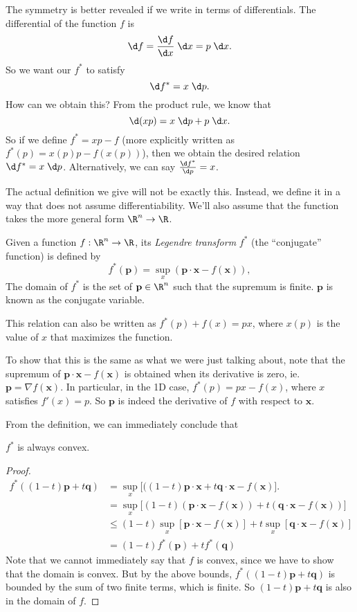 \documentclass[a4paper]{article}
\begin{document}
The symmetry is better revealed if we write in terms of differentials. The differential of the function $f$ is
\[
  \d f = \frac{\d f}{\d x}\;\d x = p\;\d x.
\]
So we want our $f^*$ to satisfy
\[
  \d f^* = x\;\d p.
\]
How can we obtain this? From the product rule, we know that
\[
  \d (xp) = x\;\d p + p\;\d x.
\]
So if we define $f^* = xp - f$ (more explicitly written as $f^*(p) = x(p)p - f(x(p))$), then we obtain the desired relation $\d f^* = x\;\d p$. Alternatively, we can say $\frac{\d f^*}{\d p} = x$.

The actual definition we give will not be exactly this. Instead, we define it in a way that does not assume differentiability. We'll also assume that the function takes the more general form $\R^n \to \R$.
\begin{defi}
  Given a function $f: \R^n \to \R$, its \emph{Legendre transform} $f^*$ (the ``conjugate'' function) is defined by
  \[
    f^*(\mathbf{p}) = \sup_{x}(\mathbf{p}\cdot \mathbf{x} - f(\mathbf{x})),
  \]
  The domain of $f^*$ is the set of $\mathbf{p}\in \R^n$ such that the supremum is finite. $\mathbf{p}$ is known as the conjugate variable.
\end{defi}
This relation can also be written as $f^*(p) + f(x) = px$, where $x(p)$ is the value of $x$ that maximizes the function.

To show that this is the same as what we were just talking about, note that the supremum of $\mathbf{p}\cdot \mathbf{x} - f(\mathbf{x})$ is obtained when its derivative is zero, ie. $\mathbf{p} = \nabla f(\mathbf{x})$. In particular, in the 1D case, $f^*(p) = px - f(x)$, where $x$ satisfies $f'(x) = p$. So $\mathbf{p}$ is indeed the derivative of $f$ with respect to $\mathbf{x}$.

From the definition, we can immediately conclude that
\begin{lemma}
  $f^*$ is always convex.
\end{lemma}

\begin{proof}
  \begin{align*}
    f^*((1 - t)\mathbf{p} + t\mathbf{q}) &= \sup_x \big[((1 - t)\mathbf{p}\cdot \mathbf{x} + t\mathbf{q}\cdot \mathbf{x} - f(\mathbf{x})\big].\\
    &= \sup_x \big[(1 - t)(\mathbf{p}\cdot \mathbf{x} - f(\mathbf{x})) + t(\mathbf{q}\cdot \mathbf{x} - f(\mathbf{x}))\big]\\
    &\leq (1 - t)\sup_x [\mathbf{p}\cdot \mathbf{x} - f(\mathbf{x})] + t\sup_x[\mathbf{q}\cdot \mathbf{x}  - f(\mathbf{x})]\\
    &= (1 - t)f^*(\mathbf{p}) + tf^*(\mathbf{q})
  \end{align*}
  Note that we cannot immediately say that $f$ is convex, since we have to show that the domain is convex. But by the above bounds, $f^*((1 - t)\mathbf{p} + t\mathbf{q})$  is bounded by the sum of two finite terms, which is finite. So $(1 - t)\mathbf{p} + t\mathbf{q}$ is also in the domain of $f$.
\end{proof}
\end{document}
